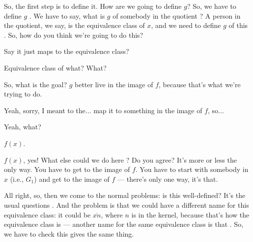 \begin{proofWrapper}

\begin{speech}[00:05:13 - 00:05:40]
So, the first step is to define it. How are we going to define $g$? So, we have to define $g$ . We have to say, what is $g$ of somebody in the quotient ? A person in the quotient, we say, is the equivalence class of $x$, and we need to define $g$ of this . So, how do you think we're going to do this?
\end{speech}

\begin{student}
Say it just maps to the equivalence class?
\end{student}

\begin{speech}[00:05:44 - 00:05:54]
Equivalence class of what?  What?

So, what is the goal? $g$ better live in the image of $f$, because that's what we're trying to do.
\end{speech}

\begin{student}
Yeah, sorry, I meant to the... map it to something in the image of $f$, so...
\end{student}

\begin{speech}[00:05:59 - 00:06:01]
Yeah, what?
\end{speech}

\begin{student}
$f(x)$.
\end{student}

\begin{speech}[00:06:02 - 00:07:08]
$f(x)$, yes! What else could we do here ? Do you agree? It's more or less the only way. You have to get to the image of $f$. You have to start with somebody in $x$ (i.e., $G_1$) and get to the image of $f$ --- there's only one way, it's that.

All right, so, then we come to the normal problems: is this well-defined? It's the usual questions . And the problem is that we could have a different name for this equivalence class: it could be $\overline{xn}$, where $n$ is in the kernel, because that's how the equivalence class is --- another name for the same equivalence class is that . So, we have to check this gives the same thing.


\end{speech}
\end{proofWrapper}
